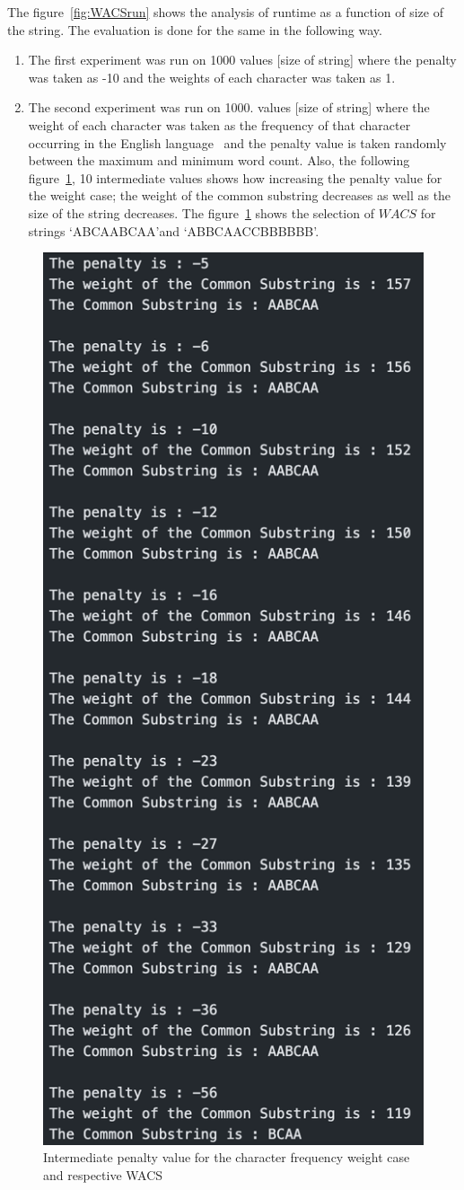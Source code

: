 \documentclass{article}
\begin{document}
The figure~\ref{fig:WACSrun} shows the analysis of runtime  as a function of size of the string. The evaluation is done for the same in the following way. 
\begin{enumerate}
    \item The first experiment was run on 1000 values [size of string] where the penalty was taken as -10 and the weights of each character was taken as 1.
    \item The second experiment was run on 1000. values [size of string] where the weight of each character was taken as the frequency of that character occurring in the English language~\cite{dictionaries2010frequency} and the penalty value is taken randomly between the maximum and minimum word count. 
    Also, the following figure~\ref{fig:interWACS}, 10 intermediate values shows how increasing the penalty value for the weight case; the weight of the common substring decreases as well as the size of the string decreases. The figure~\ref{fig:interWACS} shows the selection of $WACS$  for strings \lq ABCAABCAA\rq and \lq ABBCAACCBBBBBB\rq.
\end{enumerate}
\clearpage
\begin{figure}[t!]
    \centering
    \includegraphics[width=.30\textwidth]{Screen Shot 2021-11-13 at 1.41.36 PM.png}
    \caption{Intermediate penalty value for the character frequency weight case and respective WACS}
    \label{fig:interWACS}
\end{figure}
\end{document}
